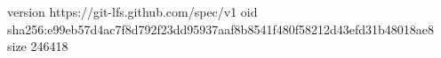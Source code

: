 version https://git-lfs.github.com/spec/v1
oid sha256:e99eb57d4ac7f8d792f23dd95937aaf8b8541f480f58212d43efd31b48018ae8
size 246418
